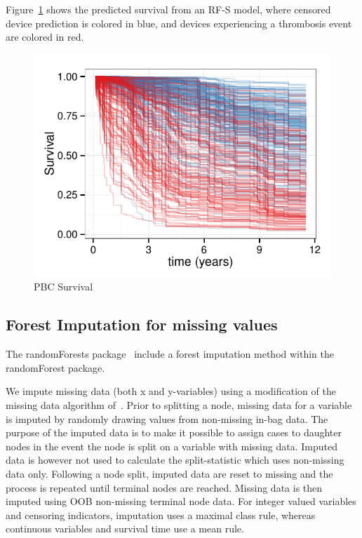 \documentclass[nojss]{jss}\usepackage[]{graphicx}\usepackage[]{color}
\makeatletter
\def\maxwidth{ %
  \ifdim\Gin@nat@width>\linewidth
    \linewidth
  \else
    \Gin@nat@width
  \fi
}
\makeatother
\begin{document}
Figure~\ref{fig:rfsrc-plot} shows the predicted survival from an RF-S model, where censored device prediction is colored in blue, and devices experiencing a thrombosis event are colored in red.  
\begin{Schunk}
\begin{figure}[!htpb]

{\centering \includegraphics[width=\maxwidth]{figure/rfs-rfsrc-plot-1} 

}

\caption[PBC Survival]{PBC Survival\label{fig:rfsrc-plot}}
\end{figure}
\end{Schunk}
\subsection{Forest Imputation for missing values}\label{S:imputation}

The randomForests package~\citep{liaw:2002} include a forest imputation method within the randomForest package. 

We impute missing data (both x and y-variables) using a modification of the missing data algorithm of~\cite{Ishwaran:2008}. Prior to splitting a node, missing data for a variable is imputed by randomly drawing values from non-missing in-bag data. The purpose of the imputed data is to make it possible to assign cases to daughter nodes in the event the node is split on a variable with missing data. Imputed data is however not used to calculate the split-statistic which uses non-missing data only. Following a node split, imputed data are reset to missing and the process is repeated until terminal nodes are reached. Missing data is then imputed using OOB non-missing terminal node data. For integer valued variables and censoring indicators, imputation uses a maximal class rule, whereas continuous variables and survival time use a mean rule.
\end{document}
